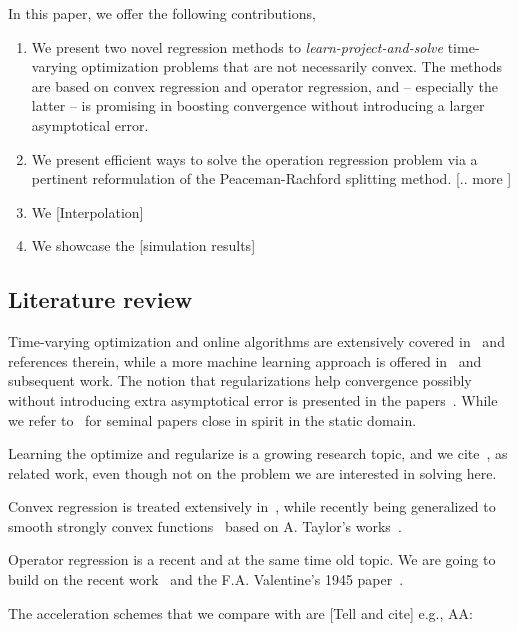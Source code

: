 \documentclass{article}
\begin{document}
In this paper, we offer the following contributions,
\begin{enumerate}
\item We present two novel regression methods to \emph{learn-project-and-solve} time-varying optimization problems that are not necessarily convex. The methods are based on convex regression and operator regression, and -- especially the latter -- is promising in boosting convergence without introducing a larger asymptotical error. 
\item We present efficient ways to solve the operation regression problem via a pertinent reformulation of the Peaceman-Rachford splitting method. [.. more ]
\item We [Interpolation]
\item We showcase the [simulation results]
\end{enumerate}

\subsection{Literature review}

Time-varying optimization and online algorithms are extensively covered in~\cite{SPM, simonetto_time-varying_2020} and references therein, while a more machine learning approach is offered in~\cite{Jadbabaie2015} and subsequent work. The notion that regularizations help convergence possibly without introducing extra asymptotical error is presented in the papers~\cite{Simonetto2014d, Bastianello2020asi}. While we refer to~\cite{Devolder2011,Nedic2011} for seminal papers close in spirit in the static domain. 

Learning the optimize and regularize is a growing research topic, and we cite~\cite{Nghiem2018,Ongie2020}, as related work, even though not on the problem we are interested in solving here. 

Convex regression is treated extensively in~\cite{Seijo2011,Lim2012,Mazumder2019,Blanchet2019}, while recently being generalized to smooth strongly convex functions~\cite{simonetto_smooth_2021} based on A. Taylor's works~\cite{Taylor2016, Taylor2017}.

Operator regression is a recent and at the same time old topic. We are going to build on the recent work~\cite{ryu_operator_2020} and the F.A. Valentine's 1945 paper~\cite{valentine_lipschitz_1945}.

The acceleration schemes that we compare with are [Tell and cite] e.g., AA: \cite{pmlr-v119-mai20a}
\end{document}
